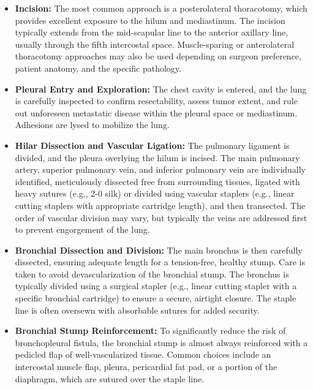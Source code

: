 \begin{itemize}
  \item \textbf{Incision:} The most common approach is a posterolateral thoracotomy, which provides excellent exposure to the hilum and mediastinum. The incision typically extends from the mid-scapular line to the anterior axillary line, usually through the fifth intercostal space. Muscle-sparing or anterolateral thoracotomy approaches may also be used depending on surgeon preference, patient anatomy, and the specific pathology.
  
  \item \textbf{Pleural Entry and Exploration:} The chest cavity is entered, and the lung is carefully inspected to confirm resectability, assess tumor extent, and rule out unforeseen metastatic disease within the pleural space or mediastinum. Adhesions are lysed to mobilize the lung.
  
  \item \textbf{Hilar Dissection and Vascular Ligation:} The pulmonary ligament is divided, and the pleura overlying the hilum is incised. The main pulmonary artery, superior pulmonary vein, and inferior pulmonary vein are individually identified, meticulously dissected free from surrounding tissues, ligated with heavy sutures (e.g., 2-0 silk) or divided using vascular staplers (e.g., linear cutting staplers with appropriate cartridge length), and then transected. The order of vascular division may vary, but typically the veins are addressed first to prevent engorgement of the lung.
  
  \item \textbf{Bronchial Dissection and Division:} The main bronchus is then carefully dissected, ensuring adequate length for a tension-free, healthy stump. Care is taken to avoid devascularization of the bronchial stump. The bronchus is typically divided using a surgical stapler (e.g., linear cutting stapler with a specific bronchial cartridge) to ensure a secure, airtight closure. The staple line is often oversewn with absorbable sutures for added security.
  
  \item \textbf{Bronchial Stump Reinforcement:} To significantly reduce the risk of bronchopleural fistula, the bronchial stump is almost always reinforced with a pedicled flap of well-vascularized tissue. Common choices include an intercostal muscle flap, pleura, pericardial fat pad, or a portion of the diaphragm, which are sutured over the staple line.
  

\end{itemize}
